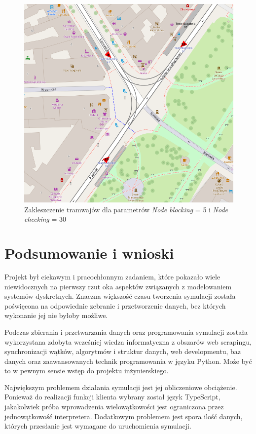 \documentclass[12pt,a4paper]{article}
\begin{document}
        \begin{figure}[H]
            \centering
            \includegraphics[width=\textwidth]{distance-20-30.png}
            \caption{Zakleszczenie tramwajów dla parametrów \textit{Node blocking} = 5 i \textit{Node checking} = 30}
        \end{figure}

    \section {Podsumowanie i wnioski}
        Projekt był ciekawym i pracochłonnym zadaniem, które pokazało wiele niewidocznych na pierwszy rzut oka aspektów związanych z modelowaniem systemów dyskretnych. Znaczna większość czasu tworzenia symulacji została poświęcona na odpowiednie zebranie i przetworzenie danych, bez których wykonanie jej nie byłoby możliwe.

        Podczas zbierania i przetwarzania danych oraz programowania symulacji została wykorzystana zdobyta wcześniej wiedza informatyczna z obszarów web scrapingu, synchronizacji wątków, algorytmów i struktur danych, web developmentu, baz danych oraz zaawansowanych technik programowania w języku Python. Może być to w pewnym sensie wstęp do projektu inżynierskiego.

        Największym problemem działania symulacji jest jej obliczeniowe obciążenie. Ponieważ do realizacji funkcji klienta wybrany został język TypeScript, jakakolwiek próba wprowadzenia wielowątkowości jest ograniczona przez jednowątkowość interpretera. Dodatkowym problemem jest spora ilość danych, których przesłanie jest wymagane do uruchomienia symulacji.
\end{document}
